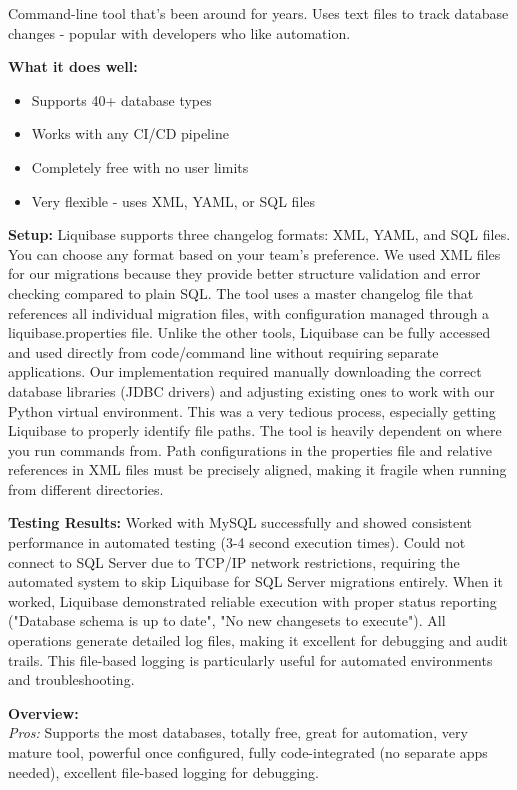 \documentclass[11pt,a4paper]{article}
\begin{document}
Command-line tool that's been around for years. Uses text files to track database changes - popular with developers who like automation.

\textbf{What it does well:}
\begin{itemize}
    \item Supports 40+ database types
    \item Works with any CI/CD pipeline
    \item Completely free with no user limits
    \item Very flexible - uses XML, YAML, or SQL files
\end{itemize}

\textbf{Setup:} Liquibase supports three changelog formats: XML, YAML, and SQL files. You can choose any format based on your team's preference. We used XML files for our migrations because they provide better structure validation and error checking compared to plain SQL. The tool uses a master changelog file that references all individual migration files, with configuration managed through a liquibase.properties file. Unlike the other tools, Liquibase can be fully accessed and used directly from code/command line without requiring separate applications. Our implementation required manually downloading the correct database libraries (JDBC drivers) and adjusting existing ones to work with our Python virtual environment. This was a very tedious process, especially getting Liquibase to properly identify file paths. The tool is heavily dependent on where you run commands from. Path configurations in the properties file and relative references in XML files must be precisely aligned, making it fragile when running from different directories.

\textbf{Testing Results:} Worked with MySQL successfully and showed consistent performance in automated testing (3-4 second execution times). Could not connect to SQL Server due to TCP/IP network restrictions, requiring the automated system to skip Liquibase for SQL Server migrations entirely. When it worked, Liquibase demonstrated reliable execution with proper status reporting ("Database schema is up to date", "No new changesets to execute"). All operations generate detailed log files, making it excellent for debugging and audit trails. This file-based logging is particularly useful for automated environments and troubleshooting.

\textbf{Overview:}\\
\textit{Pros:} Supports the most databases, totally free, great for automation, very mature tool, powerful once configured, fully code-integrated (no separate apps needed), excellent file-based logging for debugging.
\end{document}
